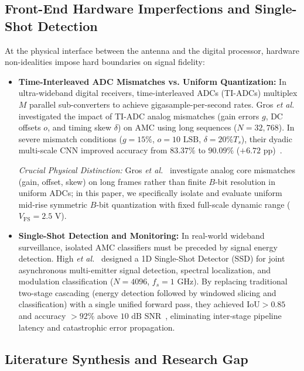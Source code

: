 \subsection{Front-End Hardware Imperfections and Single-Shot Detection}
\label{subsec:rel_adc_singleshot}

At the physical interface between the antenna and the digital processor, hardware non-idealities impose hard boundaries on signal fidelity:
\begin{itemize}
    \item \textbf{Time-Interleaved ADC Mismatches vs. Uniform Quantization:} In ultra-wideband digital receivers, time-interleaved ADCs (TI-ADCs) multiplex $M$ parallel sub-converters to achieve gigasample-per-second rates. Gros \emph{et al.}~\cite{gros2025mitigating} investigated the impact of TI-ADC analog mismatches (gain errors $g$, DC offsets $o$, and timing skew $\delta$) on AMC using long sequences ($N=32,768$). In severe mismatch conditions ($g=15\%$, $o=10\text{ LSB}$, $\delta=20\% T_s$), their dyadic multi-scale CNN improved accuracy from $83.37\%$ to $90.09\%$ ($+6.72\text{ pp}$)~\cite[Table~V]{gros2025mitigating}.
    
    \emph{Crucial Physical Distinction:} Gros \emph{et al.}~\cite{gros2025mitigating} investigate analog core mismatches (gain, offset, skew) on long frames rather than finite $B$-bit resolution in uniform ADCs; in this paper, we specifically isolate and evaluate uniform mid-rise symmetric $B$-bit quantization with fixed full-scale dynamic range ($V_{\text{FS}} = 2.5\text{ V}$).
    \item \textbf{Single-Shot Detection and Monitoring:} In real-world wideband surveillance, isolated AMC classifiers must be preceded by signal energy detection. High \emph{et al.}~\cite{high2026singleshot} designed a 1D Single-Shot Detector (SSD) for joint asynchronous multi-emitter signal detection, spectral localization, and modulation classification ($N=4096$, $f_s = 1\text{ GHz}$). By replacing traditional two-stage cascading (energy detection followed by windowed slicing and classification) with a single unified forward pass, they achieved $\text{IoU} > 0.85$ and accuracy $>92\%$ above $10\text{ dB}$ SNR~\cite[Fig.~3]{high2026singleshot}, eliminating inter-stage pipeline latency and catastrophic error propagation.
\end{itemize}

\subsection{Literature Synthesis and Research Gap}
\label{subsec:rel_matrix_gap}

